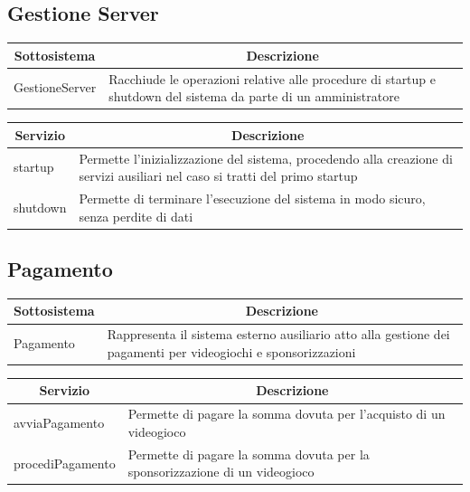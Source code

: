 \subsection{Gestione Server}
\begin{center}
	\begin{tabular}{||l | p{22em}||} 
	\hline
	\multicolumn{1}{||c|}{\textbf{Sottosistema}} & \multicolumn{1}{c||}{\textbf{Descrizione}} \\
	\hline\hline
	GestioneServer & Racchiude le operazioni relative alle procedure di startup e shutdown del sistema da parte di un amministratore \\ 
	\hline
   \end{tabular}
\end{center}

\begin{center}
	\begin{tabular}{||l | p{26em}||} 
	\hline
	\multicolumn{1}{||c|}{\textbf{Servizio}} & \multicolumn{1}{c||}{\textbf{Descrizione}} \\
	\hline\hline
	startup & Permette l’inizializzazione del sistema, procedendo alla creazione di servizi ausiliari nel caso si tratti del primo startup \\
	\hline
	shutdown & Permette di terminare l’esecuzione del sistema in modo sicuro, senza perdite di dati \\
	\hline
   \end{tabular}
\end{center}

\subsection{Pagamento}
\begin{center}
	\begin{tabular}{||l | p{22em}||} 
	\hline
	\multicolumn{1}{||c|}{\textbf{Sottosistema}} & \multicolumn{1}{c||}{\textbf{Descrizione}} \\
	\hline\hline
	Pagamento & Rappresenta il sistema esterno ausiliario atto alla gestione dei pagamenti per videogiochi e sponsorizzazioni \\ 
	\hline
   \end{tabular}
\end{center}

\begin{center}
	\begin{tabular}{||l | p{24em}||} 
	\hline
	\multicolumn{1}{||c|}{\textbf{Servizio}} & \multicolumn{1}{c||}{\textbf{Descrizione}} \\
	\hline\hline
	avviaPagamento & Permette di pagare la somma dovuta per l’acquisto di un videogioco \\
	\hline
	procediPagamento & Permette di pagare la somma dovuta per la sponsorizzazione di un videogioco \\
	\hline
   \end{tabular}
\end{center}